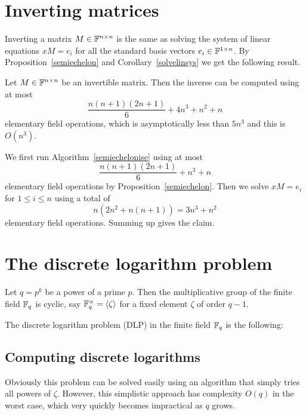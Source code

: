 \section{Inverting matrices}
\label{sec:invert}

Inverting a matrix $M \in \mathbb{F}^{n \times n}$ is the same as solving the
system of linear equations $xM = e_i$ for all the standard basis
vectors $e_i \in \mathbb{F}^{1 \times n}$. By Proposition~\ref{semiechelon}
and Corollary~\ref{solvelinsys} we get the following result.

\begin{Prop}
Let $M \in \mathbb{F}^{n \times n}$ be an invertible matrix. Then the inverse
can be computed using at most
\[ \frac{n(n+1)(2n+1)}{6} + 4n^3 + n^2 + n \]
elementary field operations, which is asymptotically less than $5n^3$
and this is $O(n^3)$.
\end{Prop}
\proofbeg
We first run Algorithm~\ref{semiechelonise} using at most
\[ \frac{n(n+1)(2n+1)}{6} + n^3 + n \]
elementary field operations by Proposition~\ref{semiechelon}. Then
we solve $xM = e_i$ for $1 \le i \le n$ using a total of
\[ n(2n^2+n(n+1)) = 3n^3+n^2 \]
elementary field operations. Summing up gives the claim.
\proofend

\section{The discrete logarithm problem}
\label{thedlp}

\begin{Problem}
    Let $q = p^k$ be a power of a prime $p$. Then the multiplicative
    group of the finite field $\mathbb{F}_q$ is cyclic, say $\mathbb{F}_q^\times =
    \left< \zeta \right>$ for a fixed element $\zeta$ of order $q-1$.

    The discrete logarithm problem (DLP) in the finite field $\mathbb{F}_q$ is
    the following:

    \begin{center}
\end{center}
\end{Problem}

\subsection{Computing discrete logarithms}

Obviously this problem can be solved easily using an algorithm that
simply tries all powers of $\zeta$. However, this simplistic approach
has complexity $O(q)$ in the worst case, which very quickly
becomes impractical as $q$ grows.

